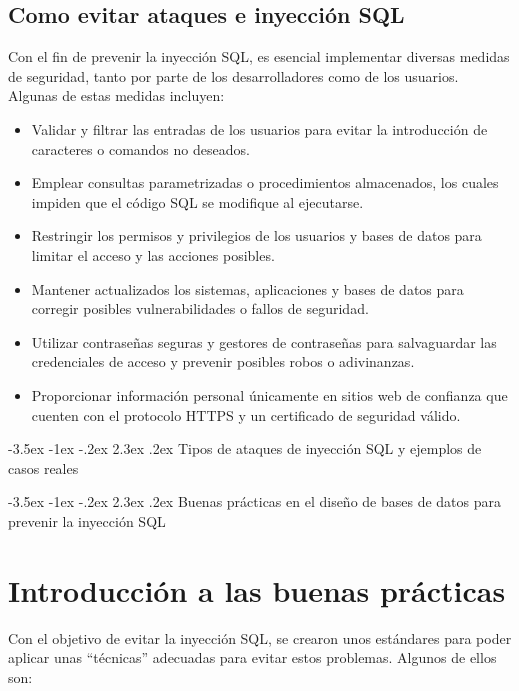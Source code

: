 \documentclass[11pt]{report}
\makeatletter
\renewcommand\chapter{\@startsection{chapter}{0}{\z@}%
    {-3.5ex \@plus -1ex \@minus -.2ex}%
    {2.3ex \@plus.2ex}%
    {\normalfont\Large\bfseries}}
\makeatother
\begin{document}
\subsection{Como evitar ataques e inyección SQL}
Con el fin de prevenir la inyección SQL, es esencial implementar diversas medidas de
seguridad, tanto por parte de los desarrolladores como de los usuarios. Algunas de estas
medidas incluyen:
\begin{itemize}
\item Validar y filtrar las entradas de los usuarios para evitar la introducción de caracteres
o comandos no deseados.
\item Emplear consultas parametrizadas o procedimientos almacenados, los cuales
impiden que el código SQL se modifique al ejecutarse.
\item Restringir los permisos y privilegios de los usuarios y bases de datos para limitar el
acceso y las acciones posibles.
\item Mantener actualizados los sistemas, aplicaciones y bases de datos para corregir
posibles vulnerabilidades o fallos de seguridad.
\item Utilizar contraseñas seguras y gestores de contraseñas para salvaguardar las
credenciales de acceso y prevenir posibles robos o adivinanzas.
\item Proporcionar información personal únicamente en sitios web de confianza que
cuenten con el protocolo HTTPS y un certificado de seguridad válido.
\end{itemize}

\cleardoublepage

\chapter{Tipos de ataques de inyección SQL y ejemplos de casos reales}

\cleardoublepage

\chapter{Buenas prácticas en el diseño de bases de datos para prevenir la inyección SQL}
\section{Introducción a las buenas prácticas}
Con el objetivo de evitar la inyección SQL, se crearon unos estándares para poder aplicar unas 
“técnicas” adecuadas para evitar estos problemas. Algunos de ellos son:
\end{document}
